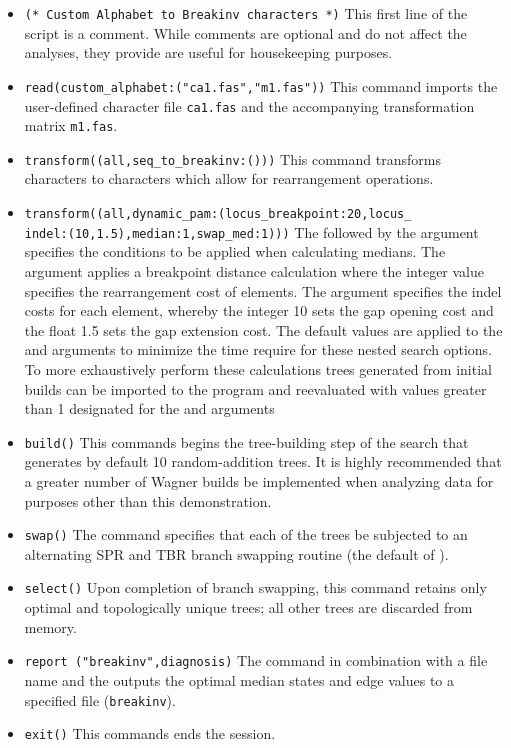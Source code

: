 \begin{itemize}
\item \texttt{(* Custom Alphabet to Breakinv characters  *)} This first line of the script is a comment. While comments are optional and do not affect the analyses, they provide are useful for housekeeping purposes.
\item \texttt{read(custom\_alphabet:("ca1.fas","m1.fas"))} This command imports the user-defined  character file \texttt{ca1.fas} and the accompanying transformation matrix \texttt{m1.fas}.
\item \texttt{transform((all,seq\_to\_breakinv:()))} This command transforms  characters to  characters which allow for rearrangement operations.
\item \texttt{transform((all,dynamic\_pam:(locus\_breakpoint:20,locus\_\\indel:(10,1.5),median:1,swap\_med:1)))}  The  follow\-ed by the argument  specifies the conditions to be applied when calculating medians. The argument  applies a breakpoint distance calculation where the integer value specifies the rearrangement cost of  elements. The argument  specifies the indel costs for each  element, whereby the integer 10 sets the gap opening cost and the float 1.5 sets the gap extension cost.  The default values are applied to the  and  arguments to minimize the time require for these nested search options.   To more exhaustively perform these calculations trees generated from initial builds can be imported to the program and reevaluated with values greater than 1 designated for the  and  arguments
\item \texttt{build()} This commands begins the tree-building step of the search that generates by default 10 random-addition trees.  It is highly recommended that a greater number of Wagner builds be implemented when analyzing data for purposes other than this demonstration.
\item \texttt{swap()} The  command specifies that each of the trees be subjected to an alternating SPR and TBR branch swapping routine (the default of \poy).
\item \texttt{select()} Upon completion of branch swapping, this command retains only optimal and topologically unique trees; all other trees are discarded from memory. 
\item \texttt{report ("breakinv",diagnosis)}  The  command in combination with a file name and the  outputs the optimal median states and edge values to a specified file (\texttt{breakinv}). 
\item \texttt{exit()} This commands ends the \poy session.
\end{itemize}

